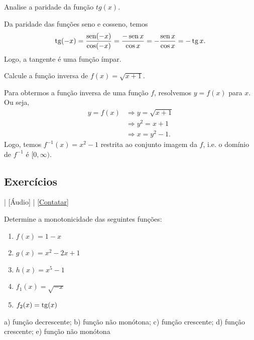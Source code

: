 \begin{exeresol}
  Analise a paridade da função $tg(x)$.
\end{exeresol}
\begin{resol}
  Da paridade das funções seno e cosseno, temos
  \begin{equation}
    \operatorname{tg}(-x) = \frac{\operatorname{sen}(-x)}{\cos(-x)} = \frac{-\operatorname{sen} x}{\cos x} = -\frac{\operatorname{sen} x}{\cos x} = -\operatorname{tg} x.
  \end{equation}
  Logo, a tangente é uma função ímpar.
\end{resol}

\begin{exeresol}
  Calcule a função inversa de $f(x) = \sqrt{x+1}$.
\end{exeresol}
\begin{resol}
  Para obtermos a função inversa de uma função $f$, resolvemos $y = f(x)$ para $x$. Ou seja,
  \begin{align}
    y = f(x) &\Rightarrow y = \sqrt{x+1}\\
             &\Rightarrow y^2 = x+1\\
             &\Rightarrow x = y^2 - 1.
  \end{align}
  Logo, temos $f^{-1}(x) = x^2 - 1$ restrita ao conjunto imagem da $f$, i.e. o domínio de $f^{-1}$ é $[0, \infty)$.
\end{resol}

\subsection*{Exercícios}

\begin{flushright}
  [Vídeo] | [Áudio] | \href{https://phkonzen.github.io/notas/contato.html}{[Contatar]}
\end{flushright}

\begin{exer}
  Determine a monotonicidade das seguintes funções:
  \begin{enumerate}
  \item $f(x)=1-x$
  \item $g(x)=x^2-2x+1$
  \item $h(x)=x^5-1$
  \item $f_1(x) = \sqrt{-x}$
  \item $f_2(x) = \operatorname{tg}(x)$
  \end{enumerate}
\end{exer}
\begin{resp}
  a) função decrescente; b) função não monótona; c) função crescente; d) função crescente; e) função não monótona 
\end{resp}

